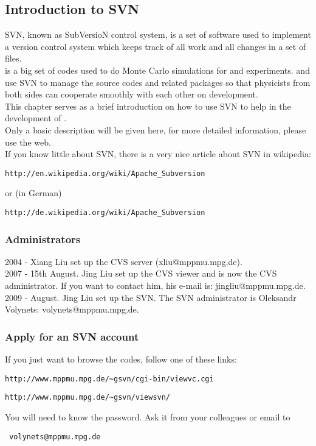 \subsection{Introduction to SVN}
\label{sec:SVN}
SVN, known as SubVersioN control system, is a set of software used to implement a version control system which keeps track of all work and all changes in a set of files.\\
\mage is a big set of codes used to do Monte Carlo simulations for \gerda\hspace{0cm} and \majorana\hspace{0cm} experiments. \majorana\hspace{0cm} and \gerda\hspace{0cm} use SVN to manage the \mage source codes and related packages so that physicists from both sides can cooperate smoothly with each other on \mage development.\\
This chapter serves as a brief introduction on how to use SVN to help in the development of \mage.\\
Only a basic description will be given here, for more detailed information, please use the web.\\
If you know little about SVN, there is a very nice article about SVN in wikipedia:\\
\begin{lstlisting}
http://en.wikipedia.org/wiki/Apache_Subversion
\end{lstlisting}
or (in German)
\begin{lstlisting}
http://de.wikipedia.org/wiki/Apache_Subversion
\end{lstlisting}

\subsubsection{Administrators}
2004 - Xiang Liu set up the CVS server (xliu@mppmu.mpg.de).\\
2007 - 15th August. Jing Liu set up the CVS viewer and is now the CVS administrator. If you want to contact him, his e-mail is: jingliu@mppmu.mpg.de.\\
2009 - August. Jing Liu set up the SVN. The SVN administrator is Oleksandr Volynets: volynets@mppmu.mpg.de.\\

\subsubsection{Apply for an SVN account}
If you just want to browse the \mage codes, follow one of these links:
\begin{lstlisting}
http://www.mppmu.mpg.de/~gsvn/cgi-bin/viewvc.cgi
\end{lstlisting}
\begin{lstlisting}
http://www.mppmu.mpg.de/~gsvn/viewsvn/
\end{lstlisting}
You will need to know the password. Ask it from your colleagues or email to
\begin{lstlisting}
 volynets@mppmu.mpg.de
\end{lstlisting}

